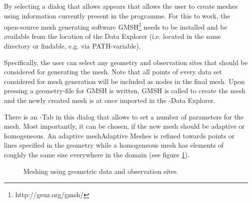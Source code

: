 By selecting  a dialog that allows appears that allows the user to create meshes using information currently present in the programme. For this to work, the open-source mesh generating software GMSH\footnote{http://geuz.org/gmsh/} needs to be installed and be available from the location of the Data Explorer (i.e. located in the same directory or findable, e.g. via PATH-variable).

Specifically, the user can select any geometry and observation sites that should be considered for generating the mesh. Note that all points of every data set considered for mesh generation will be included as nodes in the final mesh. Upon pressing  a geometry-file for GMSH is written, GMSH is called to create the mesh and the newly created mesh is at once imported in the \ogs-Data Explorer.

There is an -Tab in this dialog that allows to set a number of parameters for the mesh. Most importantly, it can be chosen, if the new mesh should be adaptive or homogeneous. An adaptive mesh{Adaptive Meshes} is refined towards points or lines specified in the geometry while a homogeneous mesh has elements of roughly the same size everywhere in the domain (see figure \ref{fig:meshing}).

\begin{figure}[tb]
\begin{center}
\enspace
{}\enspace
{}
\end{center}
\caption{Meshing using geometric data and observation sites.} \label{fig:meshing}
\end{figure}

